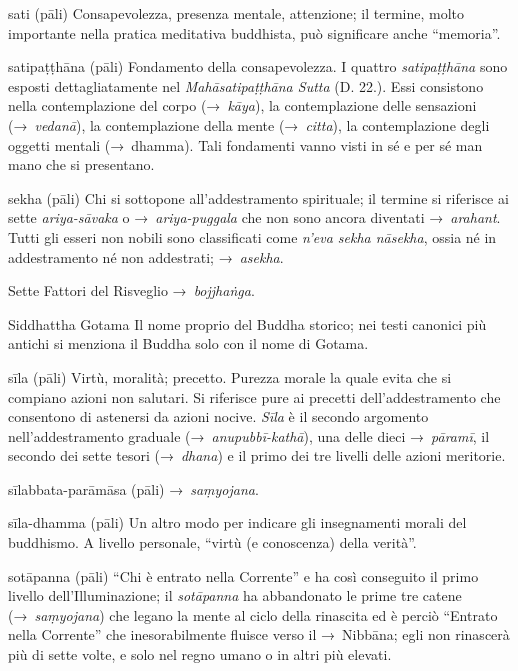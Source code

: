 \begin{glossarydescription}
\item[sati] (pāli) Consapevolezza, presenza mentale, attenzione; il termine,
  molto importante nella pratica meditativa buddhista, può significare anche
  ``memoria''.

\item[satipaṭṭhāna] (pāli)\label{glossary-satipatthana} Fondamento della consapevolezza. I quattro
  \emph{satipaṭṭhāna} sono esposti dettagliatamente nel
  \emph{Mahāsatipaṭṭhāna Sutta} (D. 22.). Essi consistono
  nella contemplazione del corpo (→~\emph{kāya}), la contemplazione delle
  sensazioni (→~\emph{vedanā}), la contemplazione della mente (→~\emph{citta}),
  la contemplazione degli oggetti mentali (→~dhamma). Tali fondamenti
  vanno visti in sé e per sé man mano che si presentano.

\item[sekha] (pāli) Chi si sottopone all'addestramento spirituale; il termine si
  riferisce ai sette \emph{ariya-sāvaka} o →~\emph{ariya-puggala} che non sono
  ancora diventati →~\emph{arahant}. Tutti gli esseri non nobili sono
  classificati come \emph{n'eva sekha nāsekha}, ossia né in addestramento né non
  addestrati; →~\emph{asekha}.

\item[Sette Fattori del Risveglio] →~\emph{bojjhaṅga}.

\item[Siddhattha Gotama] Il nome proprio del Buddha storico; nei testi canonici
  più antichi si menziona il Buddha solo con il nome di Gotama.

\item[sīla] (pāli) Virtù, moralità; precetto. Purezza morale la quale evita che
  si compiano azioni non salutari. Si riferisce pure ai precetti
  dell'addestramento che consentono di astenersi da azioni nocive. \emph{Sīla} è
  il secondo argomento nell'addestramento graduale (→~\emph{anupubbī-kathā}),
  una delle dieci →~\emph{pāramī}, il secondo dei sette tesori (→~\emph{dhana})
  e il primo dei tre livelli delle azioni meritorie.

\item[sīlabbata-parāmāsa] (pāli) →~\emph{saṃyojana}.

\item[sīla-dhamma] (pāli) Un altro modo per indicare gli insegnamenti morali del
  buddhismo. A livello personale, ``virtù (e conoscenza) della verità''.

\item[sotāpanna] (pāli) ``Chi è entrato nella Corrente'' e ha così conseguito il
  primo livello dell'Illuminazione; il \emph{sotāpanna} ha abbandonato le prime
  tre catene (→~\emph{saṃyojana}) che legano la mente al ciclo della rinascita
  ed è perciò ``Entrato nella Corrente'' che inesorabilmente fluisce verso il
  →~Nibbāna; egli non rinascerà più di sette volte, e solo nel regno
  umano o in altri più elevati.


\end{glossarydescription}
